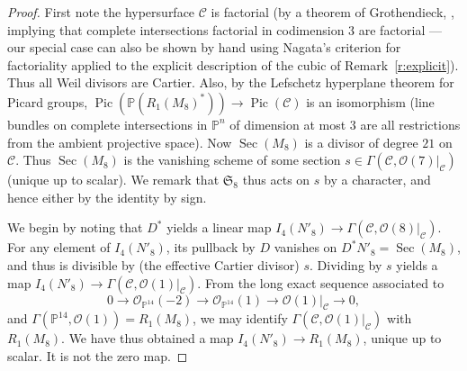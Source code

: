 \documentclass{amsart}
\theoremstyle{definition}
\theoremstyle{remark}
\DeclareMathOperator{\Pic}{Pic}
\DeclareMathOperator{\Sec}{Sec}
\def\SS{\mathfrak{S}}
\def\proj{\mathbb{P}}
\def\cubic{\mathcal{C}}
\def\oh{\mathcal{O}}
\begin{document}

\begin{proof}
  First note the hypersurface $\cubic$ is factorial (by a theorem of
  Grothendieck,
  \cite[Exp.\ XI, 3.14]{sga2}, implying that complete intersections
  factorial in codimension $3$ are factorial --- our special case can also be shown by hand
  using Nagata's criterion for factoriality \cite[Lem.\ 19.20]{e}
  applied to the explicit description of the cubic of
  Remark~\ref{r:explicit}).  Thus all Weil divisors are Cartier.
  Also, by the Lefschetz hyperplane theorem for Picard groups,
  $\Pic(\proj(R_1(M_8)^*)) \to \Pic(\cubic)$ is an isomorphism
  \cite[Exp.\ XII, Cor.~3.7]{sga2} (line bundles on complete
  intersections in $\proj^n$ of dimension at most $3$ are all
  restrictions from the ambient projective space).  Now $\Sec (M_8)$ is a
  divisor of degree $21$ on $\cubic$.  Thus $\Sec(M_8)$ is the
  vanishing scheme of some section $s \in \Gamma( \cubic,
  \oh(7)|_{\cubic})$ (unique up to scalar).  We remark that $\SS_8$
thus acts on $s$ by a character, and hence either by the identity by sign.

  We begin by noting that $D^*$ yields a linear map $I_4(N'_8)
  \rightarrow \Gamma(\cubic, \oh(8)|_{\cubic}).$ For any element of
  $I_4(N'_8)$, its pullback by $D$ vanishes on $D^* N'_8 = \Sec(M_8)$,
  and thus is divisible by (the effective Cartier divisor) $s$.
  Dividing by $s$ yields a map $I_4(N'_8) \rightarrow \Gamma(\cubic,
  \oh(1)|_{\cubic})$.  From the long exact sequence associated to $$0
  \rightarrow \oh_{\proj^{14}}(-2) \rightarrow \oh_{\proj^{14}}(1)
  \rightarrow \oh(1)|_{\cubic} \rightarrow 0,$$ and $\Gamma(\proj^{14},
  \oh(1)) = R_1(M_8)$, we may identify $\Gamma(\cubic, \oh(1)|_{\cubic})$
  with $R_1(M_8)$.  We have thus obtained a map $I_4(N'_8) \rightarrow
  R_1(M_8)$, unique up to scalar.    It is not the zero map.
\end{proof}
\end{document}
